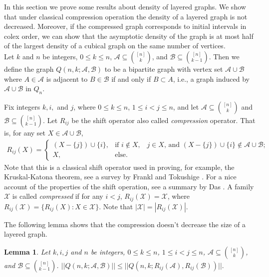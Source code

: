\documentclass[11pt, a4paper]{article}
\newtheorem{lemma}[theorem]{Lemma}
\newcommand{\cA}{\mathcal{A}}
\newcommand{\cB}{\mathcal{B}}
\newcommand{\cX}{\mathcal{X}}
\begin{document}
In this section we prove some results about density of layered graphs. We show that under classical compression operation the density of a layered graph is not decreased. Moreover, if the compressed graph corresponds to initial intervals in colex order, we can show  that the asymptotic density of the graph is at most half of the largest density of a cubical graph on the same number of vertices. \\



Let $k$ and $n$ be integers,  $0\leq k\leq n$,  $\cA\subseteq\binom{[n]}{k}$, and $\cB\subseteq\binom{[n]}{k-1}$. 
	Then we define  the graph $Q(n,k;\cA,\cB)$ to be  a bipartite graph with vertex set $\cA\cup\cB$ where $A\in\cA$ is adjacent to $B\in\cB$ if and only if $B\subset A$, i.e., 
	a graph induced by $\cA\cup \cB$ in $Q_n$.
	
	Fix integers $k, i, $ and $j$, where $0\leq k\leq n$, $1\leq i<j\leq n$,  and let $\cA\subseteq\binom{[n]}{k}$ and $\cB\subseteq\binom{[n]}{k-1}$. 
	Let $R_{ij}$ be the shift operator also called {\it compression} operator. That is, for any set $X\in \cA\cup \cB$,
	\begin{align*}
		R_{ij}(X) 	= 	\left\{ 	\begin{array}{ll}
						 		(X-\{j\})\cup\{i\}, 		&\mbox{if $i\not\in X$, ~ $j\in X$, and $(X-\{j\})\cup\{i\}\not\in \cA\cup \cB;$ }\\
								X, 				&\mbox{else.}
							\end{array}\right.
							\end{align*}
	Note that this is a classical shift operator used in proving, for example, the Kruskal-Katona theorem, see  a survey by Frankl and Tokushige  \cite{FT}. For a nice account of the properties of the shift operation, see a summary by Das \cite{Das}. 
	A family  $\cX$ is called {\it compressed}  if for any $i<j$, $R_{ij}(\cX) = \cX$, where $R_{ij}(\cX) = \{ R_{ij}(X): X\in \cX\}$. Note that $|\cX|= |R_{ij}(\cX)|$. 



The following lemma shows that the compression doesn't decrease the size of a layered graph.

\begin{lemma}\label{compressed}
Let $k, i, j $ and $n$ be  integers,  $0\leq k\leq n$, $1\leq i<j\leq n$,   $\cA\subseteq\binom{[n]}{k}$, and $\cB\subseteq\binom{[n]}{k-1}$. 
$||Q(n,k;\cA,\cB)|| \leq ||Q(n,k; R_{ij}(\cA), R_{ij}(\cB))||.$
\end{lemma}
\end{document}
